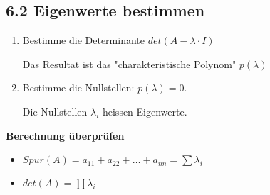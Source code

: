 \subsection{6.2 Eigenwerte bestimmen}{


\begin{enumerate}[label=\protect\circled{\arabic*}, itemsep=-1pt]
\item Bestimme die Determinante $det(A - \lambda \cdot I)$ \par Das Resultat ist das "charakteristische Polynom" \hskip2pt $p(\lambda)$
\item Bestimme die Nullstellen: $p(\lambda) = 0$. \par Die Nullstellen $\lambda_i$ heissen Eigenwerte.
\end{enumerate}

\colbreak
\vspace{4pt}
\textbf{Berechnung überprüfen}
\vspace{-2pt}
\begin{itemize}[leftmargin=0.29cm, itemsep=0.5pt]
\item $Spur(A) = a_{11} + a_{22} + \hdots + a_{nn} = \sum \lambda_i$
\item $det(A) = \prod \lambda_i$
\end{itemize}
\vspace{-1.1mm}
}
\WhiteSpace